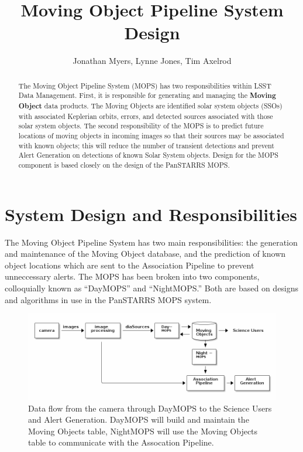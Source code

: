\documentclass[12pt,preprint]{aastex}
\begin{document}
\title{Moving Object Pipeline System Design}

\author{Jonathan Myers, Lynne Jones, Tim Axelrod}

\begin{abstract}

The Moving Object Pipeline System (MOPS) has two responsibilities
within LSST Data Management.  First, it is responsible for generating
and managing the \textbf{Moving Object} data products.  The Moving
Objects are identified solar system objects (SSOs) with associated
Keplerian orbits, errors, and detected sources associated with those
solar system objects.  The second responsibility of the MOPS is to
predict future locations of moving objects in incoming images so that
their sources may be associated with known objects; this will reduce
the number of transient detections and prevent Alert Generation on
detections of known Solar System objects.  Design for the MOPS
component is based closely on the design of the PanSTARRS MOPS.

\end{abstract}

\tableofcontents


\section{System Design and Responsibilities}

The Moving Object Pipeline System has two main responsibilities: the
generation and maintenance of the Moving Object database, and the
prediction of known object locations which are sent to the Association
Pipeline to prevent unneccessary alerts.  The MOPS has been broken
into two components, colloquially known as ``DayMOPS'' and ``NightMOPS.''
Both are based on designs and algorithms in use in the PanSTARRS MOPS
system.
 

\begin{figure}[!ht]
\centering
  \includegraphics[width=13cm]{illustrations/mopsWithinLsst.png}
\caption{ Data flow from the camera through DayMOPS to the Science
  Users and Alert Generation.  DayMOPS will build and maintain the
  Moving Objects table, NightMOPS will use the Moving Objects table to
  communicate with the Assocation Pipeline.  }
\label{mopsWithinLsst}
\end{figure}
\end{document}
